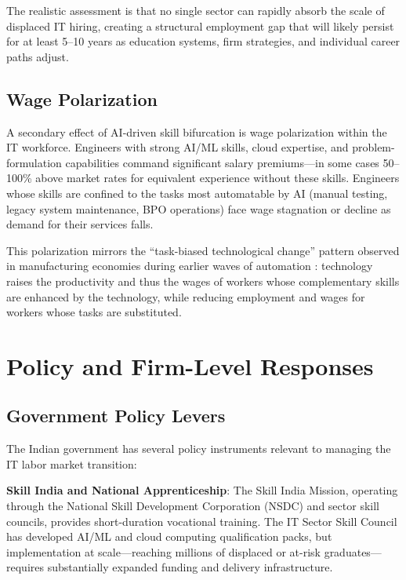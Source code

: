 \documentclass[conference]{IEEEtran}
\begin{document}
The realistic assessment is that no single sector can rapidly absorb the scale of displaced IT hiring, creating a structural employment gap that will likely persist for at least 5--10 years as education systems, firm strategies, and individual career paths adjust.

\subsection{Wage Polarization}

A secondary effect of AI-driven skill bifurcation is wage polarization within the IT workforce. Engineers with strong AI/ML skills, cloud expertise, and problem-formulation capabilities command significant salary premiums---in some cases 50--100\% above market rates for equivalent experience without these skills. Engineers whose skills are confined to the tasks most automatable by AI (manual testing, legacy system maintenance, BPO operations) face wage stagnation or decline as demand for their services falls.

This polarization mirrors the ``task-biased technological change'' pattern observed in manufacturing economies during earlier waves of automation \cite{acemoglu2002technical}: technology raises the productivity and thus the wages of workers whose complementary skills are enhanced by the technology, while reducing employment and wages for workers whose tasks are substituted.

\section{Policy and Firm-Level Responses}
\label{sec:policy}

\subsection{Government Policy Levers}

The Indian government has several policy instruments relevant to managing the IT labor market transition:

\textbf{Skill India and National Apprenticeship}: The Skill India Mission, operating through the National Skill Development Corporation (NSDC) and sector skill councils, provides short-duration vocational training. The IT Sector Skill Council has developed AI/ML and cloud computing qualification packs, but implementation at scale---reaching millions of displaced or at-risk graduates---requires substantially expanded funding and delivery infrastructure.
\end{document}
